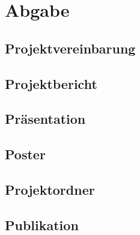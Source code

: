 \chapter{Abgabe}

\section{Projektvereinbarung}
\section{Projektbericht}
\section{Präsentation}
\section{Poster}
\section{Projektordner}
\section{Publikation}